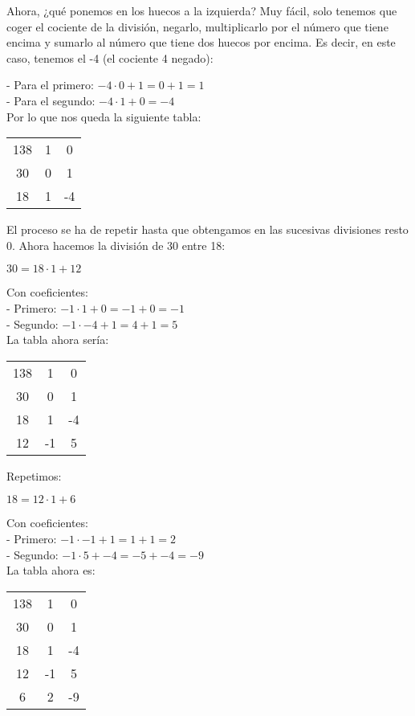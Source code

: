 \documentclass[11pt, a4paper, titlepage]{article}
\begin{document}
Ahora, ¿qué ponemos en los huecos a la izquierda? Muy fácil, solo tenemos que coger el cociente de la división, negarlo, multiplicarlo por el número que tiene encima y sumarlo al número que tiene dos huecos por encima. Es decir, en este caso, tenemos el -4 (el cociente 4 negado):

- Para el primero: $ -4 \cdot 0 + 1 = 0 + 1 = 1 $ \\
- Para el segundo: $ -4 \cdot 1 + 0 = -4 $ \\

Por lo que nos queda la siguiente tabla:


\begin{center}
\begin{tabular}{c|cc}
138 & 1 & 0 \\
30 & 0 & 1 \\
\hline
18 & 1 & -4 \\
\end{tabular}
\end{center}

El proceso se ha de repetir hasta que obtengamos en las sucesivas divisiones resto 0. Ahora hacemos la
división de 30 entre 18:

$ 30 = 18 \cdot 1 + 12 $

Con coeficientes: \\
- Primero: $ -1 \cdot 1 + 0 = -1 + 0 = -1 $ \\
- Segundo: $ -1 \cdot -4 + 1 = 4 + 1 = 5 $ \\

La tabla ahora sería:

\begin{center}
\begin{tabular}{c|cc}
138 & 1 & 0 \\
30 & 0 & 1 \\
\hline
18 & 1 & -4 \\
\hline
12 & -1 & 5
\end{tabular}
\end{center}


Repetimos:

$ 18 = 12 \cdot 1 + 6 $

Con coeficientes: \\
- Primero: $ -1 \cdot -1 + 1 = 1 + 1 = 2 $ \\
- Segundo: $ -1 \cdot 5 + -4 = -5 + -4 = -9 $ \\

La tabla ahora es:

\begin{center}
\begin{tabular}{c|cc}
138 & 1 & 0 \\
30 & 0 & 1 \\
\hline
18 & 1 & -4 \\
\hline
12 & -1 & 5 \\
\hline
6 & 2 & -9 \\
\end{tabular}
\end{center}
\end{document}
